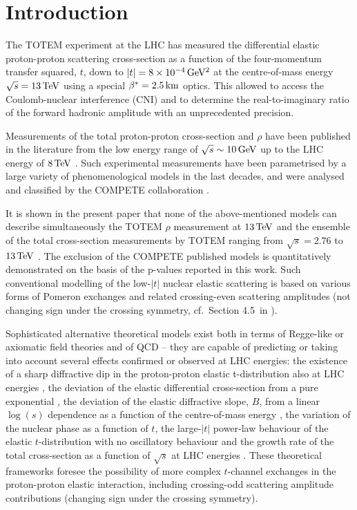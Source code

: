 \section{Introduction}
\label{sec:introduction}

The TOTEM experiment at the LHC has measured the differential elastic proton-proton scattering cross-section as a function of the four-momentum transfer squared, $t$, down to $|t| = 8\times10^{-4}\,{\rm GeV^2}$ at the centre-of-mass energy $\sqrt s = 13\,{\rm TeV}$ using a special $\beta^* = 2.5\,{\rm km}$ optics. This allowed to access the Coulomb-nuclear interference (CNI) and to determine the real-to-imaginary ratio of the forward hadronic amplitude with an unprecedented precision.

Measurements of the total proton-proton cross-section and $\rho$ have been published in the literature from the low energy range of $\sqrt s \sim 10\,{\rm GeV}$ up to the LHC energy of $8\,{\rm TeV}$ \cite{pdg-2016}. Such experimental measurements have been parametrised by a large variety of phenomenological models in the last decades, and were analysed and classified by the COMPETE collaboration \cite{compete}.

It is shown in the present paper that none of the above-mentioned models can describe simultaneously the TOTEM $\rho$ measurement at $13\,{\rm TeV}$ and the ensemble of the total cross-section measurements by TOTEM ranging from $\sqrt s = 2.76$ to $13\,{\rm TeV}$ \cite{totem-7tev-tot2,totem-8tev-90m,totem-8tev-1km,totem-13tev-90m}. The exclusion of the COMPETE published models is quantitatively demonstrated on the basis of the p-values reported in this work. Such conventional modelling of the low-$|t|$ nuclear elastic scattering is based on various forms of Pomeron exchanges and related crossing-even scattering amplitudes (not changing sign under the crossing symmetry, cf.~Section 4.5~in \cite{barone-predazzi}).

Sophisticated alternative theoretical models exist both in terms of Regge-like or axiomatic field theories \cite{nicolescu-1992} and of QCD \cite{braun} -- they are capable of predicting or taking into account several effects confirmed or observed at LHC energies: the existence of a sharp diffractive dip in the proton-proton elastic t-distribution also at LHC energies \cite{totem-7tev-first}, the deviation of the elastic differential cross-section from a pure exponential \cite{totem-8tev-90m}, the deviation of the elastic diffractive slope, $B$, from a linear $\log(s)$ dependence as a function of the centre-of-mass energy \cite{totem-13tev-90m}, the variation of the nuclear phase as a function of $t$, the large-$|t|$ power-law behaviour of the elastic $t$-distribution with no oscillatory behaviour and the growth rate of the total cross-section as a function of $\sqrt s$ at LHC energies \cite{totem-13tev-90m}. These theoretical frameworks foresee the possibility of more complex $t$-channel exchanges in the proton-proton elastic interaction, including crossing-odd scattering amplitude contributions (changing sign under the crossing symmetry).

